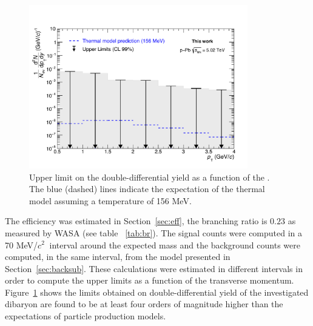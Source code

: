 \begin{figure} [htb]
    \centering
    \includegraphics[width=0.85\textwidth]{gfx/upper}
    \caption{Upper limit on the double-differential \ds yield as a function of the \pt. The blue (dashed) lines indicate the expectation of the thermal model assuming a temperature of 156 MeV.}
	\label{fig:UL}
\end{figure}

The efficiency was estimated in Section~\ref{sec:eff}, the branching ratio is $0.23$ as 
measured by WASA (see table ~\ref{tab:br}).
The signal counts were computed in a 70 MeV/${c}^{2}\ $ interval around the expected \ds mass
and the background counts were computed, in the same interval, from the model presented in Section~\ref{sec:backsub}.
These calculations were estimated in different \pt intervals in order to
compute the upper limits as a function of the transverse momentum.
Figure~\ref{fig:UL} shows the limits obtained on double-differential yield of the investigated \ds dibaryon
are found to be at least four orders of magnitude higher than the expectations of particle production models. 
